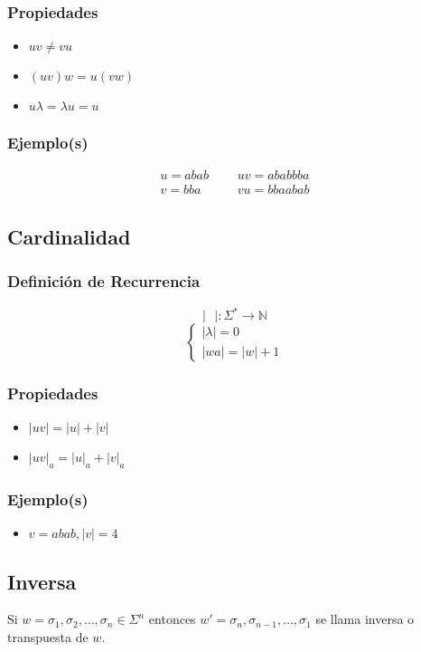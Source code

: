 \subsubsection{Propiedades}
\begin{itemize}
\item $uv\neq vu$
\item $(uv)w=u(vw)$
\item $u\lambda=\lambda u=u$
\end{itemize}
\subsubsection{Ejemplo(s)}
\begin{align*}
u=abab & \text{ } &uv=ababbba \\
v=bba  & \text{ } & vu=bbaabab
\end{align*}
\subsection{Cardinalidad}
\subsubsection{Definición de Recurrencia}
$$|\text{ }|:\Sigma^*\rightarrow\mathbb{N}$$
$$
\begin{cases}
|\lambda |=0 \\
|wa| = |w| + 1
\end{cases}
$$

\subsubsection{Propiedades}
\begin{itemize}
\item $|uv|=|u|+|v|$
\item $|uv|_a = |u|_a + |v|_a$
\end{itemize}
\subsubsection{Ejemplo(s)}
\begin{itemize}
\item $v = abab , |v| = 4$
\end{itemize}
\subsection{Inversa}
Si $w=\sigma_1,\sigma_2,\ldots ,\sigma_n \in\Sigma^n$ entonces $w'=\sigma_n,\sigma_{n-1},\ldots ,\sigma_1$ se llama inversa o transpuesta de $w$.
